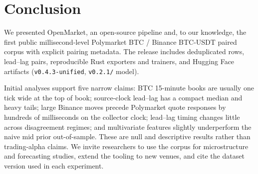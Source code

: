 \section{Conclusion}
\label{sec:conclusion}

We presented OpenMarket, an open-source pipeline and, to our knowledge, the
first public millisecond-level Polymarket BTC / Binance BTC-USDT paired corpus
with explicit pairing metadata. The release includes \OpenMarketTotalRows{}
deduplicated rows, \OpenMarketLagPairs{} lead--lag pairs, reproducible Rust
exporters and trainers, and Hugging Face artifacts
(\texttt{v0.4.3-unified}, \texttt{v0.2.1/} model).

Initial analyses support five narrow claims: BTC 15-minute books are usually
one tick wide at the top of book; source-clock lead--lag has a compact median
and heavy tails; large Binance moves precede Polymarket quote responses by
hundreds of milliseconds on the collector clock; lead--lag timing changes
little across disagreement regimes; and multivariate features slightly
underperform the naive mid prior out-of-sample. These are null and descriptive
results rather than trading-alpha claims. We invite researchers to use the corpus for
microstructure and forecasting studies, extend the tooling to new venues, and
cite the dataset version used in each experiment.
